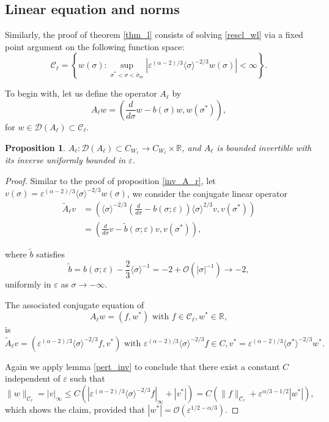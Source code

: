 \documentclass[letterpaper,11pt]{article}
\newcommand{\rmO}{\mathcal{O}}
\newcommand{\eps}{\varepsilon}
\numberwithin{equation}{section}
\theoremstyle{plain}
\newtheorem{proposition}[theorem]{Proposition}
\begin{document}
\subsection{Linear equation and norms}

Similarly, the proof of theorem \ref{thm_l} consists of solving \eqref{rescl_wl} via a fixed point argument on the following function space:
\[
\mathcal{C}_{\ell} = \left\{ w(\sigma) : \sup_{\sigma^*<\sigma<\bar{\sigma}_m} |\eps^{(\alpha-2)/3}\langle\sigma \rangle^{-2/3} w(\sigma)|<\infty \right\}.
\]


To begin with, let us define the operator $A_\ell$ by 
\[
A_\ell w = \left(\frac{d}{d\sigma}w - b(\sigma)w, w(\sigma^*)\right),
\] 
for $w \in \mathcal{D}(A_\ell) \subset \mathcal{C}_\ell.$

\begin{proposition} \label{inv_A_l}
$A_\ell : \mathcal{D}(A_\ell) \subset C_{W_\ell} \to C_{W_\ell} \times \mathbb{R}$, and $A_\ell$ is bounded invertible with its inverse uniformly bounded in $\eps$.
\end{proposition}

\begin{proof}
Similar to the proof of proposition \ref{inv_A_r}, let $v(\sigma) =\eps^{(\alpha-2)/3} \langle\sigma \rangle^{-2/3}w(\sigma)$, we consider the conjugate linear operator
\begin{align*}
\tilde{A}_\ell v &= \left( \langle \sigma\rangle^{-2/3}\left(\frac{d}{d\sigma}-b(\sigma;\eps)\right)\langle \sigma\rangle^{2/3} v, v(\sigma^*) \right) \\
&= \left( \frac{d}{d\sigma}v -\tilde{b}(\sigma;\eps)v, v(\sigma^*) \right),
\end{align*}

where $\tilde{b}$ satisfies 
\[
\tilde{b} = b(\sigma;\eps)-\frac{2}{3}\langle \sigma\rangle^{-1} =-2 + \rmO(|\sigma|^{-1}) \to -2,
\]
uniformly in $\eps$ as $\sigma \to -\infty$.

The associated conjugate equation of 
\[
A_\ell w = (f,w^*) \text{ with } f \in \mathcal{C}_\ell, w^* \in \mathbb{R} , 
\] is 
\[
\tilde{A}_\ell v = (\eps^{(\alpha-2)/3}\langle \sigma \rangle^{-2/3} f,v^*) \text{ with } \eps^{(\alpha-2)/3}\langle \sigma \rangle^{-2/3} f \in C, v^* = \eps^{(\alpha-2)/3}\langle \sigma^* \rangle^{-2/3} w^*.
\]

Again we apply lemma \ref{pert_inv} to conclude that there exist a constant $C$ independent of $\eps$ such that
\[
\|w\|_{\mathcal{C}_\ell} = |v|_\infty \le C(|\eps^{(\alpha-2)/3}\langle \sigma \rangle^{-2/3} f |_{\infty}+| v^*|) = C(\|f\|_{\mathcal{C}_\ell}+\eps^{\alpha/3-1/2}|w^*|),
\]
which shows the claim, provided that $|w^*| = \rmO(\eps^{1/2-\alpha/3})$.
\end{proof}
\end{document}
